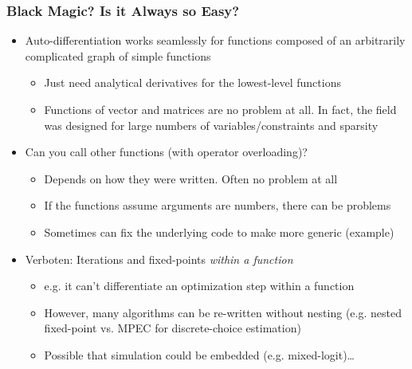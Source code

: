 \documentclass[nofootline]{etk-presentation}
\begin{document}
\begin{frame}[fragile]	\frametitle{Black Magic? Is it Always so Easy?}
	\begin{itemize}
		\item Auto-differentiation works seamlessly for functions composed of an arbitrarily complicated graph of simple functions
		\begin{itemize}
			\item Just need analytical derivatives for the lowest-level functions
			\item Functions of vector and matrices are no problem at all.  In fact, the field was designed for large numbers of variables/constraints and sparsity
		\end{itemize}
	\bigskip
		\item Can you call other functions (with operator overloading)?
		\begin{itemize}
			\item Depends on how they were written.  Often no problem at all
			\item If the functions assume arguments are numbers, there can be problems
			\item Sometimes can fix the underlying code to make more generic (example)
		\end{itemize}
	\bigskip
		\item Verboten: Iterations and fixed-points \textit{within a function}
		\begin{itemize}
			\item e.g. it can't differentiate an optimization step within a function
			\item However, many algorithms can be re-written without nesting (e.g. nested fixed-point vs. MPEC for discrete-choice estimation)
			\item Possible that simulation could be embedded (e.g. mixed-logit)\ldots
		\end{itemize}
	\end{itemize}
\end{frame}	
\end{document}
